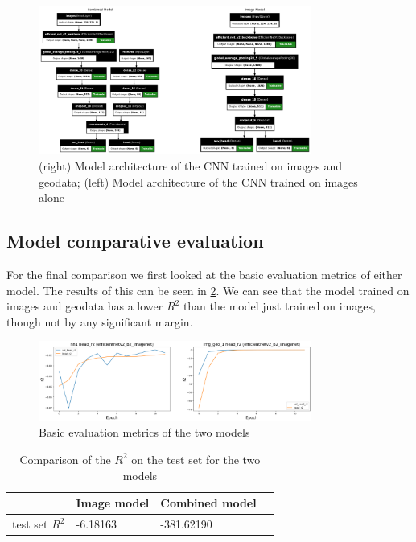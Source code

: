 \documentclass[12pt,a4paper,oneside]{article}
\begin{document}
\begin{figure}[!h]
    \centering 
    \includegraphics[width=0.8\textwidth]{assets/img_geo_model.png}
    \caption{(right) Model architecture of the CNN trained on images and geodata; (left) Model architecture of the CNN trained on images alone}
    \label{fig:geodata_model}
\end{figure}


\subsection{Model comparative evaluation}


For the final comparison we first looked at the basic evaluation metrics of either model. The results of this can be seen in \ref{fig:basic_evaluation}. We can see that the model trained on images and geodata has a lower $R^2$ than the model just trained on images, though not by any significant margin. 

\begin{figure}[!h]
    \centering
    \includegraphics[width=0.8\textwidth]{assets/fin_img_vs_geo.png}
    \caption{Basic evaluation metrics of the two models}
    \label{fig:basic_evaluation}
\end{figure}

\begin{table}[!h]
    \centering
    \begin{tabular}{@{}llll@{}}
    \toprule
    & Image model & Combined model \\ \midrule
    test set $R^2$              & -6.18163             & -381.62190   \\ \bottomrule
\end{tabular}
\caption{Comparison of the $R^2$ on the test set for the two models}
\end{table}
\end{document}
